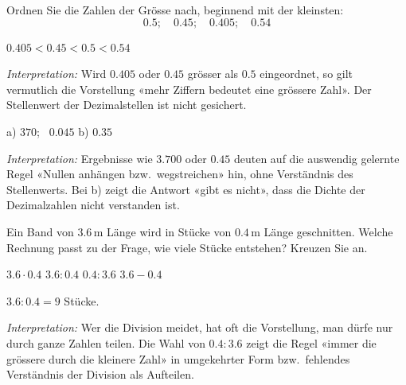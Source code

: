 \documentclass[11pt]{exam}
\newcommand{\aufgabe}[1]{%
  \needspace{8\baselineskip}%
  \renewcommand{\questionlabel}{\textbf{#1}}%
  \question}
\newcommand{\teil}[2]{\uplevel{\vspace{1ex}\textbf{\large Teil #1: #2}\par\vspace{1ex}}}
\newcommand{\geteilt}{\mathbin{:}}
\newcommand{\raum}[1]{\ifprintanswers\else\fillwithgrid{#1}\fi}
\newcommand{\diagnose}[1]{\par\smallskip\textit{Interpretation:} #1}
\begin{document}
\begin{questions}

\teil{A}{Grundlagen}

\aufgabe{1.1}
Ordnen Sie die Zahlen der Grösse nach, beginnend mit der kleinsten:
\[
  0.5; \quad 0.45; \quad 0.405; \quad 0.54
\]
\begin{solution}
  $0.405 < 0.45 < 0.5 < 0.54$
  \diagnose{Wird $0.405$ oder $0.45$ grösser als $0.5$ eingeordnet, so gilt
  vermutlich die Vorstellung «mehr Ziffern bedeutet eine grössere Zahl».
  Der Stellenwert der Dezimalstellen ist nicht gesichert.}
\end{solution}
\raum{2.5cm}

\aufgabe{1.2}
\begin{solution}
  a) $370$; \ $0.045$ \qquad b) $0.35$
  \diagnose{Ergebnisse wie $3.700$ oder $0.45$ deuten auf die auswendig gelernte
  Regel «Nullen anhängen bzw.\ wegstreichen» hin, ohne Verständnis des
  Stellenwerts. Bei b) zeigt die Antwort «gibt es nicht», dass die Dichte der
  Dezimalzahlen nicht verstanden ist.}
\end{solution}
\raum{3cm}

\aufgabe{2.1}
Ein Band von $3.6$\,m Länge wird in Stücke von $0.4$\,m Länge geschnitten.
Welche Rechnung passt zu der Frage, wie viele Stücke entstehen? Kreuzen Sie an.

\begin{oneparcheckboxes}
  \choice $3.6 \cdot 0.4$
  \CorrectChoice $3.6 \geteilt 0.4$
  \choice $0.4 \geteilt 3.6$
  \choice $3.6 - 0.4$
\end{oneparcheckboxes}
\begin{solution}
  $3.6 \geteilt 0.4 = 9$ Stücke.
  \diagnose{Wer die Division meidet, hat oft die Vorstellung, man dürfe nur durch
  ganze Zahlen teilen. Die Wahl von $0.4 \geteilt 3.6$ zeigt die Regel «immer die
  grössere durch die kleinere Zahl» in umgekehrter Form bzw.\ fehlendes Verständnis
  der Division als Aufteilen.}
\end{solution}


\end{questions}
\end{document}
